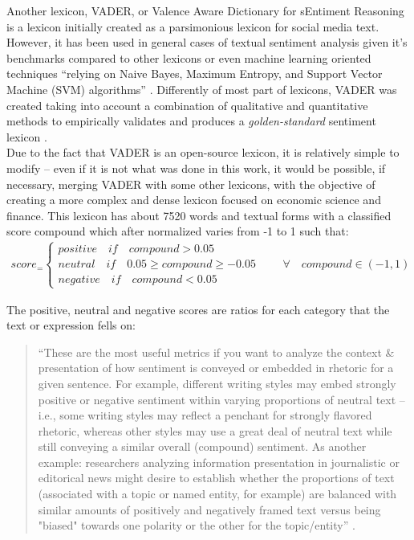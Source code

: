 
Another lexicon, VADER, or Valence Aware Dictionary for sEntiment Reasoning is a lexicon initially created as a parsimonious lexicon for social media text. However, it has been used in general cases of textual sentiment analysis given it's benchmarks compared to other lexicons or even machine learning oriented techniques ``relying on Naive Bayes, Maximum Entropy, and Support Vector Machine (SVM) algorithms'' \citep[p.216]{hutto2014vader}. Differently of most part of lexicons, VADER was created taking into account a combination of qualitative and quantitative methods to empirically validates and produces a \textit{golden-standard} sentiment lexicon \cite{hutto2014vader}.\\

Due to the fact that VADER is an open-source lexicon, it is relatively simple to modify -- even if it is not what was done in this work, it would be possible, if necessary, merging VADER with some other lexicons, with the objective of creating a more complex and dense lexicon focused on economic science and finance. This lexicon has about 7520 words and textual forms with a classified score compound which after normalized varies from -1 to 1 such that:
\begin{align} \label{eq:vaadercoumpond}
    score_ = \begin{cases}
                positive\quad if \quad compound > 0.05\\
                neutral\quad if \quad 0.05 \geq compound \geq -0.05\\
                negative\quad if \quad compound < 0.05
              \end{cases} \qquad \forall\quad compound \in (-1, 1)
\end{align}

The positive, neutral and negative scores are ratios for each category that the text or expression fells on: 
\begin{quote}
    ``These are the most useful metrics if you want to analyze the context \& presentation of how sentiment is conveyed or embedded in rhetoric for a given sentence. For example, different writing styles may embed strongly positive or negative sentiment within varying proportions of neutral text -- i.e., some writing styles may reflect a penchant for strongly flavored rhetoric, whereas other styles may use a great deal of neutral text while still conveying a similar overall (compound) sentiment. As another example: researchers analyzing information presentation in journalistic or editorical news might desire to establish whether the proportions of text (associated with a topic or named entity, for example) are balanced with similar amounts of positively and negatively framed text versus being "biased" towards one polarity or the other for the topic/entity'' \cite{vadergit}.
\end{quote}

